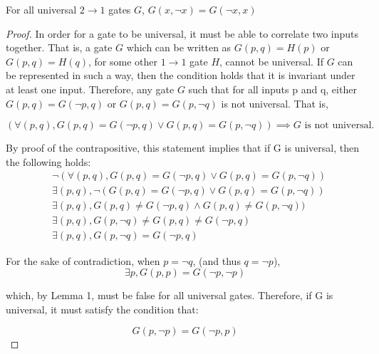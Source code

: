 \documentclass[12pt]{article}
\begin{document}
\begin{lemma}
    For all universal $2 \to 1$ gates $G$,
    $G(x, \neg x) = G(\neg x, x)$
\end{lemma}

\begin{proof}
	In order for a gate to be universal, it must be able to correlate two inputs together. That is, a gate $G$ which can be written as $G(p, q) = H(p)$ or $G(p, q) = H(q)$, for some other $1 \to 1$ gate $H$, cannot be universal. If $G$ can be represented in such a way, then the condition holds that it is invariant under at least one input. Therefore, any gate $G$ such that for all inputs p and q, either $G(p, q) = G(\neg p, q)$ or $G(p, q) = G(p, \neg q)$ is not universal. That is,

    $$(\forall (p, q), G(p, q) = G(\neg p, q) \lor G(p, q) = G(p, \neg q)) \implies G \text{ is not universal.}$$

    By proof of the contrapositive, this statement implies that if G is universal, then the following holds:
    \begin{align}
        &\neg (\forall (p, q), G(p, q) = G(\neg p, q) \lor G(p, q) = G(p, \neg q)) \\
        &\exists (p, q), \neg (G(p, q) = G(\neg p, q) \lor G(p, q) = G(p, \neg q)) \\
        &\exists (p, q), G(p, q) \ne G(\neg p, q) \land G(p, q) \ne G(p, \neg q)) \\
        &\exists (p, q), G(p, \neg q) \ne G(p, q) \ne G(\neg p, q) \\
        &\exists (p, q), G(p, \neg q) = G(\neg p, q)
    \end{align}

    For the sake of contradiction, when $p = \neg q$, (and thus $q = \neg p$),
    $$\exists p, G(p, p) = G(\neg p, \neg p)$$

    which, by Lemma 1, must be false for all universal gates. Therefore, if G is universal, it must satisfy the condition that:

    $$G(p, \neg p) = G(\neg p, p)$$
\end{proof}
\end{document}
